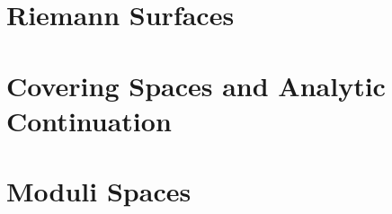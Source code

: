 \documentclass[a4paper, 8pt, notitlepage]{extreport}
\begin{document}
    

    \chapter{Riemann Surfaces}
    
    

    \chapter{Covering Spaces and Analytic Continuation}\label{cpt:covering_spaces_analytic_continuation}
    
    
    

    \chapter{Moduli Spaces}
    
    
    \printbibliography
\end{document}
